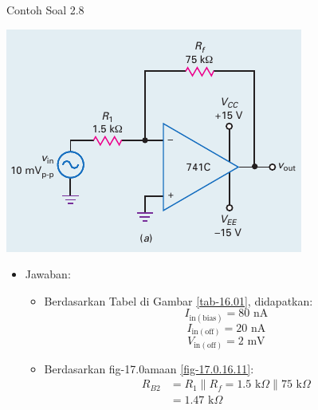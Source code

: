 \begin{frame}[t]{Contoh Soal 2.8}
	\begin{multicols}{2}
		\begin{center}
			\includegraphics[width=\linewidth]{gambar/fig-16.17a}
		\end{center}
		\columnbreak
		\begin{itemize}
			\item Jawaban:
			\begin{itemize}
				\item Berdasarkan Tabel di Gambar \ref{tab-16.01}, didapatkan:
				\[ I_{\text{in}(\text{bias})} = 80 \text{ nA} \]
				\[ I_{\text{in}(\text{off})} = 20 \text{ nA} \]
				\[ V_{\text{in}(\text{off})} = 2 \text{ mV} \]
				\item Berdasarkan fig-17.0amaan \ref{fig-17.0.16.11}:
				\begin{align*}
					R_{B2} &= R_1 \parallel R_f = 1.5 \text{ k}\Omega \parallel 75 \text{ k}\Omega \\
					&= 1.47 \text{ k}\Omega
				\end{align*}
			\end{itemize}
		\end{itemize}
	\end{multicols}
\end{frame}


